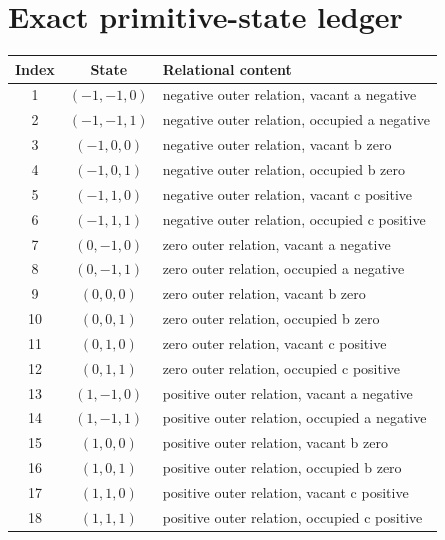\documentclass[11pt]{article}
\numberwithin{equation}{section}
\theoremstyle{remark}
\begin{document}
\section{Exact primitive-state ledger}
\begin{longtable}{ccl}
\toprule Index&State&Relational content\\\midrule\endhead

1&$(-1,-1,0)$&negative outer relation, vacant a negative\\

2&$(-1,-1,1)$&negative outer relation, occupied a negative\\

3&$(-1,0,0)$&negative outer relation, vacant b zero\\

4&$(-1,0,1)$&negative outer relation, occupied b zero\\

5&$(-1,1,0)$&negative outer relation, vacant c positive\\

6&$(-1,1,1)$&negative outer relation, occupied c positive\\

7&$(0,-1,0)$&zero outer relation, vacant a negative\\

8&$(0,-1,1)$&zero outer relation, occupied a negative\\

9&$(0,0,0)$&zero outer relation, vacant b zero\\

10&$(0,0,1)$&zero outer relation, occupied b zero\\

11&$(0,1,0)$&zero outer relation, vacant c positive\\

12&$(0,1,1)$&zero outer relation, occupied c positive\\

13&$(1,-1,0)$&positive outer relation, vacant a negative\\

14&$(1,-1,1)$&positive outer relation, occupied a negative\\

15&$(1,0,0)$&positive outer relation, vacant b zero\\

16&$(1,0,1)$&positive outer relation, occupied b zero\\

17&$(1,1,0)$&positive outer relation, vacant c positive\\

18&$(1,1,1)$&positive outer relation, occupied c positive\\

\bottomrule\end{longtable}
\end{document}
